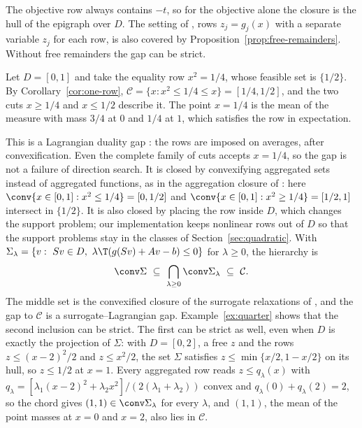 The objective row always contains $-t$, so for the objective alone the
closure is the hull of the epigraph over $D$. The setting of
\citet{LiersEtAl2021}, rows $z_j=g_j(x)$ with a separate variable $z_j$ for
each row, is also covered by Proposition~\ref{prop:free-remainders}. Without
free remainders the gap can be strict.

\begin{example}\label{ex:quarter}
Let $D=[0,1]$ and take the equality row $x^2=1/4$, whose feasible set is
$\{1/2\}$. By Corollary~\ref{cor:one-row}, $\mathcal C=\{x:x^2\le1/4\le x\}=[1/4,1/2]$,
and the two cuts $x\ge1/4$ and $x\le1/2$ describe it. The point $x=1/4$ is the
mean of the measure with mass $3/4$ at $0$ and $1/4$ at $1$, which satisfies
the row in expectation.
\end{example}

This is a Lagrangian duality gap \citep{Geoffrion1974,Nowak2005}: the rows are
imposed on averages, after convexification. Even the complete family of cuts
accepts $x=1/4$, so the gap is not a failure of direction search. It is
closed by convexifying aggregated sets instead of aggregated functions, as in
the aggregation closure of \citet{DeyMunozSerrano2022}: here
$\conv\{x\in[0,1]:x^2\le1/4\}=[0,1/2]$ and $\conv\{x\in[0,1]:x^2\ge1/4\}=[1/2,1]$
intersect in $\{1/2\}$. It is also closed by placing the row inside $D$, which
changes the support problem; our implementation keeps nonlinear rows out of
$D$ so that the support problems stay in the classes of
Section~\ref{sec:quadratic}. With
$\Sigma_\lambda=\{v:\ Sv\in D,\ \lambda\T(g(Sv)+Av-b)\le0\}$ for $\lambda\ge0$, the
hierarchy is
\[
\conv\Sigma\ \subseteq\ \bigcap_{\lambda\ge0}\conv\Sigma_\lambda\ \subseteq\ \mathcal C .
\]
The middle set is the convexified closure of the surrogate relaxations of
\citet{MullerEtAl2022}, and the gap to $\mathcal C$ is a surrogate--Lagrangian
gap. Example~\ref{ex:quarter} shows that the second inclusion can be strict.
The first can be strict as well, even when $D$ is exactly the projection of
$\Sigma$: with $D=[0,2]$, a free $z$ and the rows $z\le(x-2)^2/2$ and
$z\le x^2/2$, the set $\Sigma$ satisfies $z\le\min\{x/2,1-x/2\}$ on its hull,
so $z\le1/2$ at $x=1$. Every aggregated row reads $z\le q_\lambda(x)$ with
$q_\lambda=[\lambda_1(x-2)^2+\lambda_2x^2]/(2(\lambda_1+\lambda_2))$ convex and
$q_\lambda(0)+q_\lambda(2)=2$, so the chord gives $(1,1)\in\conv\Sigma_\lambda$ for
every $\lambda$, and $(1,1)$, the mean of the point masses at $x=0$ and $x=2$,
also lies in $\mathcal C$.
